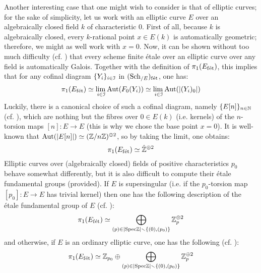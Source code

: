 \begin{example}
                Another interesting case that one might wish to consider is that of elliptic curves; for the sake of simplicity, let us work with an elliptic curve $E$ over an algebraically closed field $k$ of characteristic $0$. First of all, because $k$ is algebraically closed, every $k$-rational point $x \in E(k)$ is automatically geometric; therefore, we might as well work with $x = 0$. Now, it can be shown without too much difficulty (cf. \cite[Proposition 5.11]{kundu_etale_fundamental_group_of_elliptic_curves}) that every scheme finite \'etale over an elliptic curve over any field is automatically Galois. Together with the definition of $\pi_1(E_{\mathrm{f\acute{e}t}})$, this implies that for any cofinal diagram $\{Y_i\}_{i \in \mathcal{I}}$ in $(\mathrm{Sch}_{/E})_{\mathrm{f\acute{e}t}}$, one has:
                    $$\pi_1(E_{\mathrm{f\acute{e}t}}) \simeq \underset{i \in \mathcal{I}}{\operatorname{lim} \:} \mathrm{Aut}(F_0(Y_i)) \simeq \underset{i \in \mathcal{I}}{\operatorname{lim} \:} \mathrm{Aut}(|(Y_i)_0|)$$
                Luckily, there is a canonical choice of such a cofinal diagram, namely $\{E[n]\}_{n \in \mathbb{N}}$ (cf. \cite[Proposition 3.8]{kundu_etale_fundamental_group_of_elliptic_curves}), which are nothing but the fibres over $0 \in E(k)$ (i.e. kernels) of the $n$-torsion maps $[n]: E \to E$ (this is why we chose the base point $x = 0$). It is well-known that $\mathrm{Aut}(|E[n]|) \simeq (\mathbb{Z}/n\mathbb{Z})^{\oplus 2}$, so by taking the limit, one obtains:
                    $$\pi_1(E_{\mathrm{f\acute{e}t}}) \simeq \hat{\mathbb{Z}}^{\oplus 2}$$
                Elliptic curves over (algebraically closed) fields of positive characteristics $p_0$ behave somewhat differently, but it is also difficult to compute their \'etale fundamental groups (provided). If $E$ is supersingular (i.e. if the $p_0$-torsion map $[p_0]: E \to E$ has trivial kernel) then one has the following description of the \'etale fundamental group of $E$ (cf. \cite[Proposition 5.13]{kundu_etale_fundamental_group_of_elliptic_curves}):
                    $$\pi_1(E_{\mathrm{f\acute{e}t}}) \simeq \bigoplus_{(p) \in |\mathrm{Spec} \mathbb{Z}| \smallsetminus \{(0), (p_0)\}} \mathbb{Z}_p^{\oplus 2}$$
                and otherwise, if $E$ is an ordinary elliptic curve, one has the following (cf. \cite[Proposition 5.14]{kundu_etale_fundamental_group_of_elliptic_curves}):
                    $$\pi_1(E_{\mathrm{f\acute{e}t}}) \simeq \mathbb{Z}_{p_0} \oplus \bigoplus_{(p) \in |\mathrm{Spec} \mathbb{Z}| \smallsetminus \{(0), (p_0)\}} \mathbb{Z}_p^{\oplus 2}$$
            \end{example}
        

